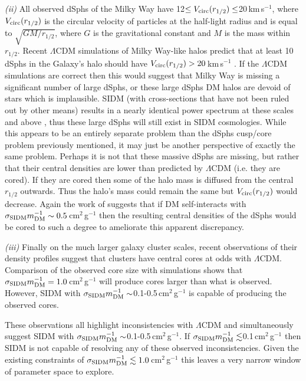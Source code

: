 {\it (ii)} All observed dSphs of the Milky Way have 12$\leq V_{\rm circ}(r_{1/2}) \leq$20\,km\,s$^{-1}$, where $V_{\rm circ}(r_{1/2})$ is the circular velocity of particles at the half-light radius and is equal to $\sqrt{GM/r_{1/2}}$, where $G$ is the gravitational constant and $M$ is the mass within $r_{1/2}$.
Recent $\Lambda$CDM simulations of Milky Way-like halos predict that at least 10 dSphs in the Galaxy's halo should have $V_{\rm circ}(r_{1/2}) > 20$\,km\,s$^{-1}$ \citep{BoylanKolchin:2012id}.
If the $\Lambda$CDM simulations are correct then this would suggest that Milky Way is missing a significant number of large dSphs, or these large dSphs DM halos are devoid of stars which is implausible.
SIDM (with cross-sections that have not been ruled out by other means) results in a nearly identical power spectrum at these scales and above \citep{Rocha:2012tr}, thus these large dSphs will still exist in SIDM cosmologies.
While this appears to be an entirely separate problem than the dSphs cusp/core problem previously mentioned, it may just be another perspective of exactly the same problem.
Perhaps it is not that these massive dSphs are missing, but rather that their central densities are lower than predicted by $\Lambda$CDM (i.e. they are cored).
If they are cored then some of the halo mass is diffused from the central $r_{1/2}$ outwards.
Thus the halo's mass could remain the same but $V_{\rm circ}(r_{1/2})$ would decrease.
Again the work of \citet{Rocha:2012tr} suggests that if DM self-interacts with $\sigma_{\rm SIDM}m_{\rm DM}^{-1} \sim 0.5$\,cm$^2$\,g$^{-1}$ then the resulting central densities of the dSphs would be cored to such a degree to ameliorate this apparent discrepancy. 

{\it (iii)} Finally on the much larger galaxy cluster scales, recent observations of their density profiles \citep{Newman:2012wt, Newman:2012tk} suggest that clusters have central cores at odds with $\Lambda$CDM.
Comparison of the observed core size with simulations \citep{Peter:2012vi, Rocha:2012tr} shows that $\sigma_{\rm SIDM}m_{\rm DM}^{-1} = 1.0$\,cm$^2$\,g$^{-1}$ will produce cores larger than what is observed.
However, SIDM with $\sigma_{\rm SIDM}m_{\rm DM}^{-1} \sim$0.1-0.5\,cm$^2$\,g$^{-1}$ is capable of producing the observed cores.

These observations all highlight inconsistencies with $\Lambda$CDM and simultaneously suggest SIDM with $\sigma_{\rm SIDM}m_{\rm DM}^{-1}  \sim$0.1-0.5\,cm$^2$\,g$^{-1}$.
If $\sigma_{\rm SIDM}m_{\rm DM}^{-1}  \lesssim$0.1\,cm$^2$\,g$^{-1}$ then SIDM is not capable of resolving any of these observed inconsistencies.
Given the existing constraints of $\sigma_{\rm SIDM}m_{\rm DM}^{-1}\lesssim 1.0$\,cm$^2$\,g$^{-1}$ this leaves a very narrow window of parameter space to explore.

